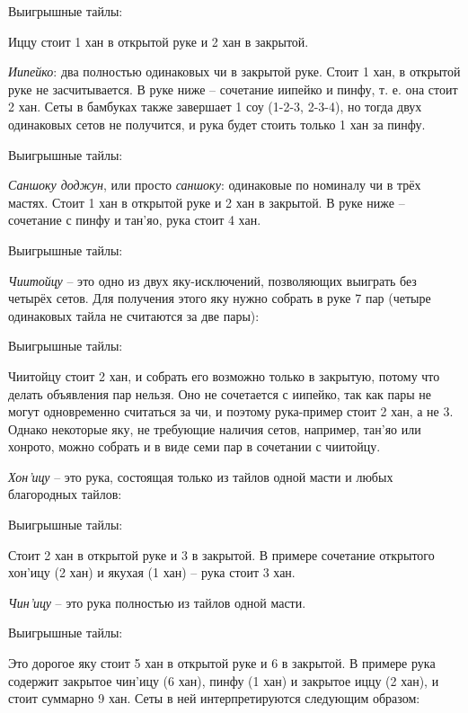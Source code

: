 Выигрышные тайлы: 

Иццу стоит 1 хан в открытой руке и 2 хан в закрытой.

\textit{Иипейко}: два полностью одинаковых чи в закрытой руке. Стоит 1 хан, в открытой руке не засчитывается. В руке ниже – сочетание иипейко и пинфу, т. е. она стоит 2 хан. Сеты в бамбуках также завершает 1 соу (1-2-3, 2-3-4), но тогда двух одинаковых сетов не получится, и рука будет стоить только 1 хан за пинфу.


Выигрышные тайлы: 

\textit{Саншоку доджун}, или просто \textit{саншоку}: одинаковые по номиналу чи в трёх мастях. Стоит 1 хан в открытой руке и 2 хан в закрытой. В руке ниже – сочетание с пинфу и тан'яо, рука стоит 4 хан.


Выигрышные тайлы: 

\textit{Чиитойцу} – это одно из двух яку-исключений, позволяющих выиграть без четырёх сетов. Для получения этого яку нужно собрать в руке 7 пар (четыре одинаковых тайла не считаются за две пары):


Выигрышные тайлы: 

Чиитойцу стоит 2 хан, и собрать его возможно только в закрытую, потому что делать объявления пар нельзя. Оно не сочетается с иипейко, так как пары не могут одновременно считаться за чи, и поэтому рука-пример стоит 2 хан, а не 3. Однако некоторые яку, не требующие наличия сетов, например, тан’яо или хонрото, можно собрать и в виде семи пар в сочетании с чиитойцу.

\textit{Хон'ицу} – это рука, состоящая только из тайлов одной масти и любых благородных тайлов:

 \hfill {}

Выигрышные тайлы: 

Стоит 2 хан в открытой руке и 3 в закрытой. В примере сочетание открытого хон'ицу (2 хан) и якухая (1 хан) – рука стоит 3 хан. 

\textit{Чин'ицу} – это рука полностью из тайлов одной масти.


Выигрышные тайлы: 

Это дорогое яку стоит 5 хан в открытой руке и 6 в закрытой. В примере рука содержит закрытое чин'ицу (6 хан), пинфу (1 хан) и закрытое иццу (2 хан), и стоит суммарно 9 хан. Сеты в ней интерпретируются следующим образом:

